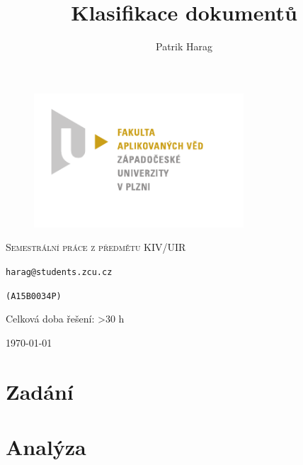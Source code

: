 \documentclass[12pt, a4paper]{report}
\title{Klasifikace dokumentů}
\author{Patrik Harag}
\makeatletter
\def \thesubtitle {Semestrální práce z předmětu KIV/UIR}
\def \theauthoremail {harag@students.zcu.cz}
\def \theauthorid {(A15B0034P)}
\makeatother
\begin{document}
\begin{titlepage}
	\begin{figure}
		\includegraphics[height=50mm]{img-fav-logo}
	\end{figure}
	
	\centering
	{\large \hspace{1mm} \par} %
	\vspace{15ex}
	
	{\scshape\Large \thesubtitle \par}
	\vspace{1.5ex}
	{\huge\bfseries \thetitle \par}
	\vspace{2ex}
	{\Large\itshape \theauthor \par}
	\vspace{2ex}
	{\texttt{\theauthoremail} \par}
	\vspace{1ex}
	{\texttt{\theauthorid} \par}
	\vspace{5ex}
	{{Celková doba řešení: \textgreater30 h} \par}
	
	\vfill

	{\large \today\par}
\end{titlepage}

\setcounter{page}{0} 
\tableofcontents
\thispagestyle{empty}


\chapter{Zadání}



\chapter{Analýza}
\end{document}

